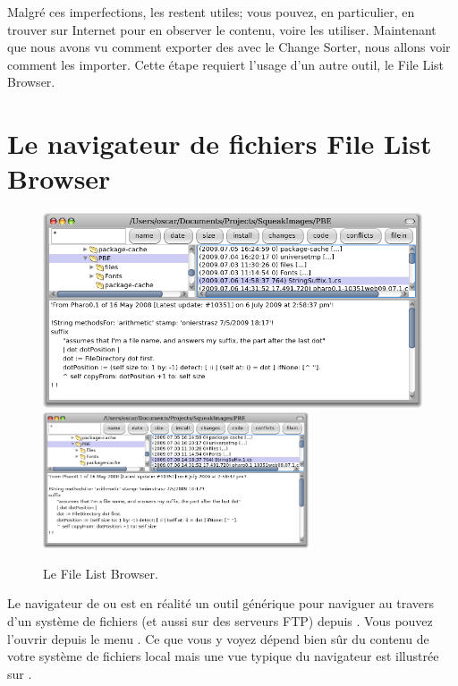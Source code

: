 \documentclass[a4paper,10pt,twoside]{book}
\begin{document}
Malgré ces imperfections, les \changesets restent utiles; vous pouvez, en particulier, en trouver sur Internet pour en observer le contenu, voire les utiliser.
Maintenant que nous avons vu comment exporter des \changesets avec le Change Sorter,
nous allons voir comment les importer.
Cette étape requiert l'usage d'un autre outil, le File List Browser.

\section{Le navigateur de fichiers File List Browser}

\begin{figure}[btp]
	\begin{center}
	\ifluluelse
		{\includegraphics[width=\textwidth]{fileList}}
		{\includegraphics[width=0.7\textwidth]{fileList}}
	\end{center}
	\caption{Le File List Browser.}
\end{figure}

Le navigateur de  ou  est
en réalité un outil générique pour naviguer au travers d'un système de fichiers
(et aussi sur des serveurs FTP) depuis \pharo.
Vous pouvez l'ouvrir depuis le menu . %
Ce que vous y voyez dépend bien sûr du contenu de votre système de fichiers local
mais une vue typique du navigateur est illustrée sur 
.
\end{document}
